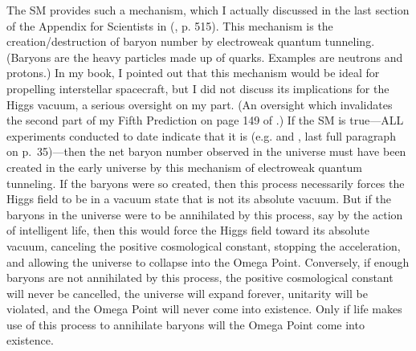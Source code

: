 \documentclass[letterpaper,12pt]{article}
\newenvironment{squote}
  {\small\quote}
  {\endquote\normalsize}
\begin{document}
\begin{squote}
The \gls{SM} provides such a mechanism, which I actually discussed in the last section of the Appendix for Scientists in (\cite{Tipler1994}, p. 515). This mechanism is the creation\slash destruction of baryon number by electroweak quantum tunneling. (Baryons are the heavy particles made up of quarks. Examples are neutrons and protons.) In my book, I pointed out that this mechanism would be ideal for propelling interstellar spacecraft, but I did not discuss its implications for the Higgs vacuum, a serious oversight on my part. (An oversight which invalidates the second part of my Fifth Prediction on page 149 of \cite{Tipler1994}.) If the \gls{SM} is true---ALL experiments conducted to date indicate that it is (e.g. \cite{Wilczek2002} and \cite{Quinn2003}, last full paragraph on p.~35)---then the net baryon number observed in the universe must have been created in the early universe by this mechanism of electroweak quantum tunneling. If the baryons were so created, then this process necessarily forces the Higgs field to be in a vacuum state that is not its absolute vacuum. But if the baryons in the universe were to be annihilated by this process, say by the action of intelligent life, then this would force the Higgs field toward its absolute vacuum, canceling the positive cosmological constant, stopping the acceleration, and allowing the universe to collapse into the Omega Point. Conversely, if enough baryons are not annihilated by this process, the positive cosmological constant will never be cancelled, the universe will expand forever, unitarity will be violated, and the Omega Point will never come into existence. Only if life makes use of this process to annihilate baryons will the Omega Point come into existence.
\end{squote}
\end{document}
